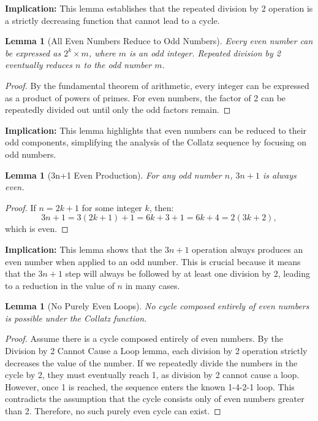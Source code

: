 \documentclass[11pt]{article}
\newtheorem{lemma}[theorem]{Lemma}
\begin{document}
\textbf{Implication:} This lemma establishes that the repeated division by 2 operation is a strictly decreasing function that cannot lead to a cycle.

\begin{lemma}[All Even Numbers Reduce to Odd Numbers]
Every even number can be expressed as \( 2^k \times m \), where \( m \) is an odd integer. Repeated division by 2 eventually reduces \( n \) to the odd number \( m \).
\end{lemma}

\begin{proof}
By the fundamental theorem of arithmetic, every integer can be expressed as a product of powers of primes. For even numbers, the factor of 2 can be repeatedly divided out until only the odd factors remain.
\end{proof}

\textbf{Implication:} This lemma highlights that even numbers can be reduced to their odd components, simplifying the analysis of the Collatz sequence by focusing on odd numbers.

\begin{lemma}[3n+1 Even Production]
For any odd number \(n\), \(3n + 1\) is always even.
\end{lemma}

\begin{proof}
If \(n = 2k + 1\) for some integer \(k\), then:
\[
3n + 1 = 3(2k + 1) + 1 = 6k + 3 + 1 = 6k + 4 = 2(3k + 2),
\]
which is even.
\end{proof}

\textbf{Implication:} This lemma shows that the \(3n+1\) operation always produces an even number when applied to an odd number. This is crucial because it means that the \(3n+1\) step will always be followed by at least one division by 2, leading to a reduction in the value of \(n\) in many cases.

\begin{lemma}[No Purely Even Loops]
No cycle composed entirely of even numbers is possible under the Collatz function.
\end{lemma}

\begin{proof}
Assume there is a cycle composed entirely of even numbers. By the Division by 2 Cannot Cause a Loop lemma, each division by 2 operation strictly decreases the value of the number. If we repeatedly divide the numbers in the cycle by 2, they must eventually reach 1, as division by 2 cannot cause a loop. However, once 1 is reached, the sequence enters the known 1-4-2-1 loop. This contradicts the assumption that the cycle consists only of even numbers greater than 2. Therefore, no such purely even cycle can exist.
\end{proof}
\end{document}
